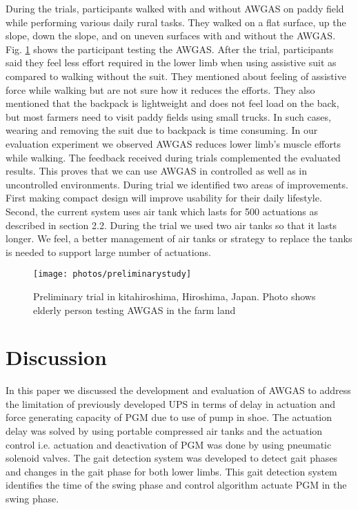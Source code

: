 \documentclass[paper,JRM,paper]{jaciiiarticle}
\begin{document}
During the trials, participants walked with and without AWGAS on paddy field while performing various daily rural tasks. They walked on a flat surface, up the slope, down the slope, and on uneven surfaces with and without the AWGAS. Fig. \ref{fig:preliminarystudy} shows the participant testing the AWGAS. After the trial, participants said they feel less effort required in the lower limb when using assistive suit as compared to walking without the suit. They mentioned about feeling of assistive force while walking but are not sure how it reduces the efforts. They also mentioned that the backpack is lightweight and does not feel load on the back, but most farmers need to visit paddy fields using small trucks. In such cases, wearing and removing the suit due to backpack is time consuming. In our evaluation experiment we observed AWGAS reduces lower limb’s muscle efforts while walking. The feedback received during trials complemented the evaluated results. This proves that we can use AWGAS in controlled as well as in uncontrolled environments. During trial we identified two areas of improvements. First making compact design will improve usability for their daily lifestyle. Second, the current system uses air tank which lasts for 500 actuations as described in section 2.2. During the trial we used two air tanks so that it lasts longer. We feel, a better management of air tanks or strategy to replace the tanks is needed to support large number of actuations. 


\begin{figure}[h]
	\centering
	\texttt{[image: photos/preliminarystudy]}
	\caption{Preliminary trial in kitahiroshima, Hiroshima, Japan. Photo shows elderly person testing AWGAS in the farm land}
	\label{fig:preliminarystudy}
\end{figure}

\section{Discussion}
In this paper we discussed the development and evaluation of AWGAS to address the limitation of previously developed UPS in terms of delay in actuation and force generating capacity of PGM due to use of pump in shoe. The actuation delay was solved by using portable compressed air tanks and the actuation control i.e. actuation and deactivation of PGM was done by using pneumatic solenoid valves. The gait detection system was developed to detect gait phases and changes in the gait phase for both lower limbs. This gait detection system identifies the time of the swing phase and control algorithm actuate PGM in the swing phase. 
\end{document}
